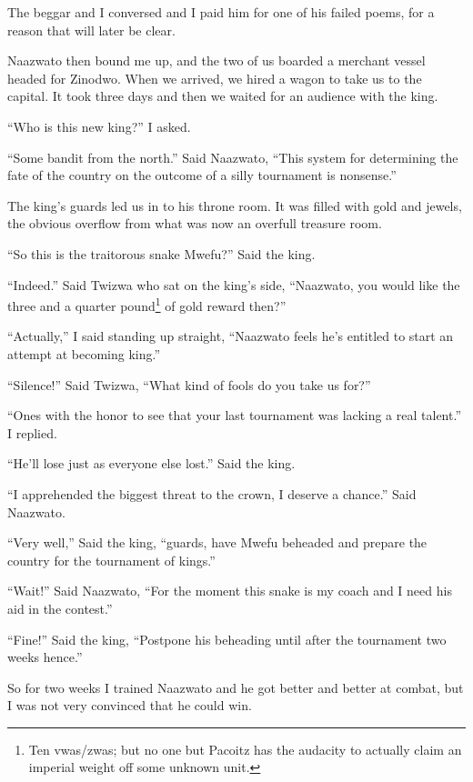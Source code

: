 The beggar and I conversed and I paid him for one of his failed poems, for a reason that will later be clear.

Naazwato then bound me up, and the two of us boarded a merchant vessel headed for Zinodwo.
When we arrived, we hired a wagon to take us to the capital. It took three days and then we waited for an audience with the king.

``Who is this new king?'' I asked.

``Some bandit from the north.'' Said Naazwato, ``This system for determining the fate of the country on the outcome of a silly tournament is nonsense.''

The king's guards led us in to his throne room. It was filled with gold and jewels, the obvious overflow from what was now an overfull treasure room.

``So this is the traitorous snake Mwefu?'' Said the king.

``Indeed.'' Said Twizwa who sat on the king's side, ``Naazwato, you would like the three and a quarter pound\footnote{Ten vwas/zwas; but no one but Pacoitz has the audacity to actually claim an imperial weight off some unknown unit.} of gold reward then?''

``Actually,'' I said standing up straight, ``Naazwato feels he's entitled to start an attempt at becoming king.''

``Silence!'' Said Twizwa, ``What kind of fools do you take us for?''

``Ones with the honor to see that your last tournament was lacking a real talent.'' I replied.

``He'll lose just as everyone else lost.'' Said the king.

``I apprehended the biggest threat to the crown, I deserve a chance.'' Said Naazwato.

``Very well,'' Said the king, ``guards, have Mwefu beheaded and prepare the country for the tournament of kings.''

``Wait!'' Said Naazwato, ``For the moment this snake is my coach and I need his aid in the contest.''

``Fine!'' Said the king, ``Postpone his beheading until after the tournament two weeks hence.''

So for two weeks I trained Naazwato and he got better and better at combat, but I was not very convinced that he could win.
